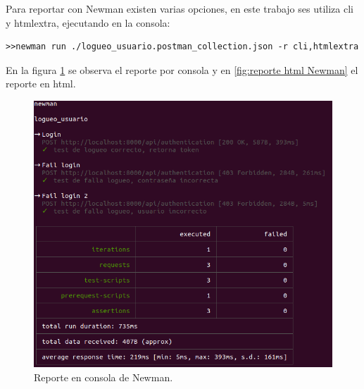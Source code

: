 Para reportar con Newman existen varias opciones, en este trabajo ses utiliza cli y htmlextra, ejecutando en la consola:



\begin{lstlisting}[label=cod:Newman,caption=  Ejecución de Newman en consola]
>>newman run ./logueo_usuario.postman_collection.json -r cli,htmlextra
\end{lstlisting}



En la figura \ref{fig:reporte cli Newman} se observa el reporte por consola y en \ref{fig:reporte html Newman} el reporte en html.

\begin{figure}[ht]
	\centering
	\includegraphics[scale=.35]{./Figures/newman-1.png}
	\caption{Reporte en consola de Newman.}
	\label{fig:reporte cli Newman}
\end{figure}


